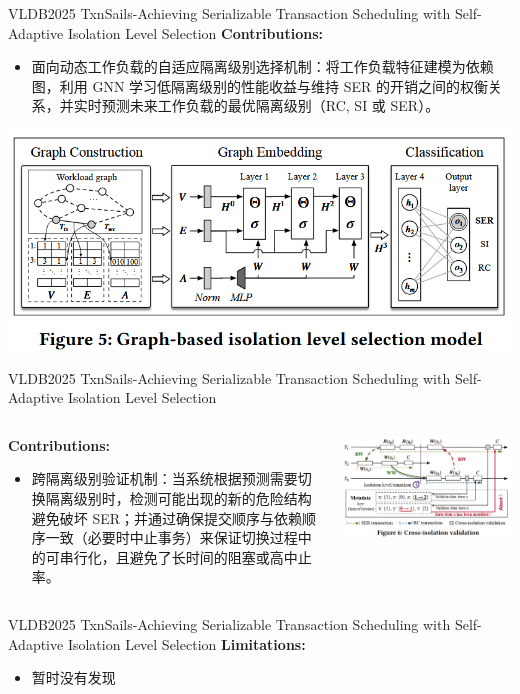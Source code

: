 \begin{frame}{VLDB2025 TxnSails-Achieving Serializable Transaction Scheduling with Self-Adaptive Isolation Level Selection}
	\textbf{Contributions: }
	\begin{itemize}
		\item 面向动态工作负载的自适应隔离级别选择机制：将工作负载特征建模为依赖图，利用 GNN 学习低隔离级别的性能收益与维持 SER 的开销之间的权衡关系，并实时预测未来工作负载的最优隔离级别（RC, SI 或 SER）。
	\end{itemize}
	\includegraphics[width=0.8\linewidth]{figs/TxnSails-selection-model}
\end{frame}

\begin{frame}{VLDB2025 TxnSails-Achieving Serializable Transaction Scheduling with Self-Adaptive Isolation Level Selection}
	\begin{columns}
		\begin{column}{0.5\textwidth}
			\textbf{Contributions: }
			\begin{itemize}
				\item 跨隔离级别验证机制：当系统根据预测需要切换隔离级别时，检测可能出现的新的危险结构避免破坏 SER；并通过确保提交顺序与依赖顺序一致（必要时中止事务）来保证切换过程中的可串行化，且避免了长时间的阻塞或高中止率。
			\end{itemize}
		\end{column}
		\begin{column}{0.5\textwidth}
			\includegraphics[width=0.98\linewidth]{figs/TxnSails-cross-isolation}
		\end{column}
	\end{columns}
\end{frame}

\begin{frame}{VLDB2025 TxnSails-Achieving Serializable Transaction Scheduling with Self-Adaptive Isolation Level Selection}
	\textbf{Limitations: }
	\begin{itemize}
		\item 暂时没有发现
	\end{itemize}
\end{frame}
